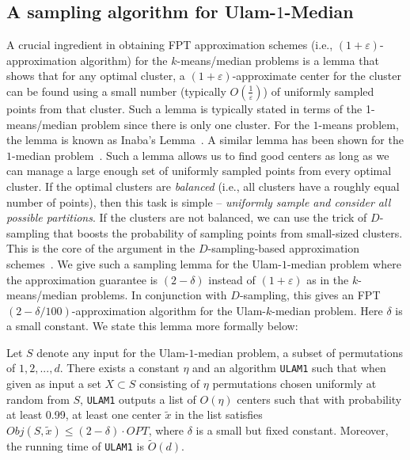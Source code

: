\documentclass[11pt]{llncs}
\newcommand{\veps}{\varepsilon}
\begin{document}
\subsection{A sampling algorithm for Ulam-$1$-Median}
A crucial ingredient in obtaining FPT approximation schemes (i.e., $(1+\veps)$-approximation algorithm) for the $k$-means/median problems is a lemma that shows that for any optimal cluster, a $(1+\veps)$-approximate center for the cluster can be found using a small number (typically $O(\frac{1}{\veps})$) of uniformly sampled points from that cluster. Such a lemma is typically stated in terms of the 1-means/median problem since there is only one cluster. For the $1$-means problem, the lemma is known as Inaba's Lemma~\cite{inaba}. A similar lemma has been shown for the $1$-median problem~\cite{kss}. 
Such a lemma allows us to find good centers as long as we can manage a large enough set of uniformly sampled points from every optimal cluster.
If the optimal clusters are {\em balanced} (i.e., all clusters have a roughly equal number of points), then this task is simple -- {\em uniformly sample and consider all possible partitions}. If the clusters are not balanced, we can use the trick of $D$-sampling that boosts the probability of sampling points from small-sized clusters. This is the core of the argument in the $D$-sampling-based approximation schemes~\cite{jks,bjk18}. 
We give such a sampling lemma for the Ulam-$1$-median problem where the approximation guarantee is $(2-\delta)$ instead of $(1+\veps)$ as in the $k$-means/median problems.
In conjunction with $D$-sampling, this gives an FPT  $(2-\delta/100)$-approximation algorithm for the Ulam-$k$-median problem. Here $\delta$ is a small constant. 
We state this lemma more formally below: 

\begin{lemma}\label{lemma:sampling}
Let $S$ denote any input for the Ulam-$1$-median problem, a subset of permutations of $1, 2, ..., d$. There exists a constant $\eta$ and an algorithm {\tt ULAM1} such that when given as input a set $X \subset S$ consisting of $\eta$ permutations chosen uniformly at random from $S$, {\tt ULAM1} outputs a list of $O(\eta)$ centers such that with probability at least 0.99, at least one center $\tilde{x}$ in the list satisfies $Obj(S, \tilde{x}) \leq (2-\delta) \cdot OPT$, where $\delta$ is a small but fixed constant. Moreover, the running time of {\tt ULAM1} is $\tilde{O}(d)$.
\end{lemma}
\end{document}
